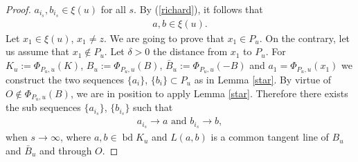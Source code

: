 \documentclass[12pt]{amsart}
\newcommand{\bd}{\operatorname*{bd}}
\begin{document}
\begin{proof}
                   $a_{i_s},b_{i_s} \in \xi(u)$ for all $s$. By (\ref{richard}), it follows that
\begin{eqnarray}\label{carla}
           a,b\in \xi(u).
\end{eqnarray}
                 Let $x_1\in \xi(u)$, $x_1\not=z$. We are going to prove that $x_1\in P_u$. On the 
                 contrary, let us assume that $x_1\notin P_u$. Let $\delta>0$ the distance from $x_1$ to 
                 $P_u$. For $K_u:=\Phi_{P_u ,u}(K)$, $B_u:=\Phi_{P_u,u}(B)$, 
                 $\bar{B}_u:=\Phi_{P_u,u }(-B)$  
                 and $a_1=\Phi_{P_u,u }(x_1)$ we construct the two sequences 
                 $\{a_i\}$, $\{b_i\}\subset P_u$ as in Lemma \ref{star}. By virtue of 
                 $O\notin \Phi_{P_u, u}(B)$, we are in position to apply Lemma \ref{star}. 
                 Therefore there exists the  sub sequences $\{a_{i_s}\}$, $\{b_{i_s}\}$ such that
\begin{eqnarray}\label{kenni}
       a_{i_s} \rightarrow a  \textrm{ and } b_{i_s} \rightarrow b,
\end{eqnarray}
                 when $s\rightarrow \infty$, where $a,b\in \bd K_u$ and $L(a,b)$ is a common 
                 tangent line of $B_u$ and $\bar{B}_u$ and through $O$. 
  

\end{proof}
\end{document}
